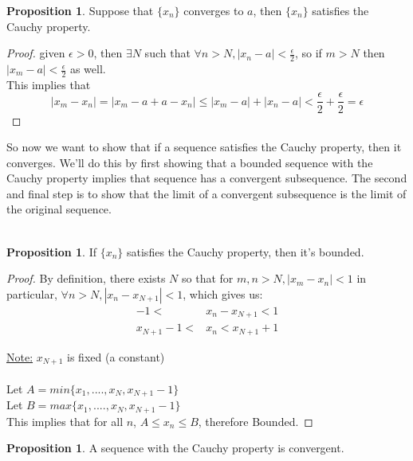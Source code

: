 \documentclass[12pt]{article}
\theoremstyle{plain}
\theoremstyle{definition}
\newtheorem{proposition}[theorem]{Proposition}
\begin{document}
\begin{proposition}
    Suppose that $\{ x_n \}$ converges to $a$, then $\{ x_n \}$ satisfies the Cauchy property.
\end{proposition}

\begin{proof}
    given $\epsilon > 0$, then $\exists N$ such that $\forall n > N, |x_n - a| < \frac{\epsilon}{2}$, so if $m > N$ then $|x_m - a| < \frac{\epsilon}{2}$ as well.\\
    This implies that
    $$|x_m - x_n| = |x_m -a + a - x_n| \leq |x_m -a| + |x_n-a| < \frac{\epsilon}{2} + \frac{\epsilon}{2} = \epsilon$$
\end{proof}

So now we want to show that if a sequence satisfies the Cauchy property, then it converges. We'll do this by first showing that a bounded sequence with the Cauchy property implies that sequence has a convergent subsequence. The second and final step is to show that the limit of a convergent subsequence is the limit of the original sequence.\\
\\
\begin{proposition}
    If $\{ x_n \}$ satisfies the Cauchy property, then it's bounded.
\end{proposition}

\begin{proof}
    By definition, there exists $N$ so that for $m,n > N, |x_m - x_n| <1$ in particular, $\forall n > N, |x_n - x_{N+1}| < 1$, which gives us:
    \begin{align*}
        -1 <& x_n - x_{N+1} < 1\\
        x_{N+1}-1 <& x_n < x_{N+1}+1
    \end{align*}
    
    \underline{Note:} $x_{N+1}$ is fixed (a constant)\\
    \\
    Let $A = min\{ x_1, .... ,x_N, x_{N+1}-1 \}$\\
    Let $B = max\{ x_1, .... ,x_N, x_{N+1}-1 \}$\\
    This implies that for all $n$, $A \leq x_n \leq B$, therefore Bounded.
    
\end{proof}

\begin{proposition}
    A sequence with the Cauchy property is convergent.
\end{proposition}
\end{document}
